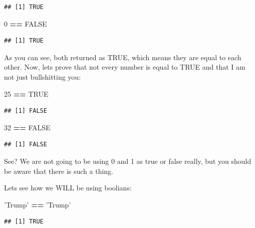 \documentclass[]{book}
\newenvironment{Shaded}{\begin{snugshade}}{\end{snugshade}}
\newcommand{\DecValTok}[1]{\textcolor[rgb]{0.00,0.00,0.81}{#1}}
\newcommand{\OperatorTok}[1]{\textcolor[rgb]{0.81,0.36,0.00}{\textbf{#1}}}
\newcommand{\OtherTok}[1]{\textcolor[rgb]{0.56,0.35,0.01}{#1}}
\newcommand{\StringTok}[1]{\textcolor[rgb]{0.31,0.60,0.02}{#1}}
\begin{document}
\begin{verbatim}
## [1] TRUE
\end{verbatim}

\begin{Shaded}
\begin{Highlighting}[]
\DecValTok{0} \OperatorTok{==}\StringTok{ }\OtherTok{FALSE}
\end{Highlighting}
\end{Shaded}

\begin{verbatim}
## [1] TRUE
\end{verbatim}

As you can see, both returned as TRUE, which means they are equal to each other. Now, lets prove that not every number is equal to TRUE and that I am not just bullshitting you:

\begin{Shaded}
\begin{Highlighting}[]
\DecValTok{25} \OperatorTok{==}\StringTok{ }\OtherTok{TRUE}
\end{Highlighting}
\end{Shaded}

\begin{verbatim}
## [1] FALSE
\end{verbatim}

\begin{Shaded}
\begin{Highlighting}[]
\DecValTok{32} \OperatorTok{==}\StringTok{ }\OtherTok{FALSE}
\end{Highlighting}
\end{Shaded}

\begin{verbatim}
## [1] FALSE
\end{verbatim}

See? We are not going to be using 0 and 1 as true or false really, but you should be aware that there is such a thing.

Lets see how we WILL be using boolians:

\begin{Shaded}
\begin{Highlighting}[]
\StringTok{'Trump'} \OperatorTok{==}\StringTok{ 'Trump'}
\end{Highlighting}
\end{Shaded}

\begin{verbatim}
## [1] TRUE
\end{verbatim}
\end{document}
